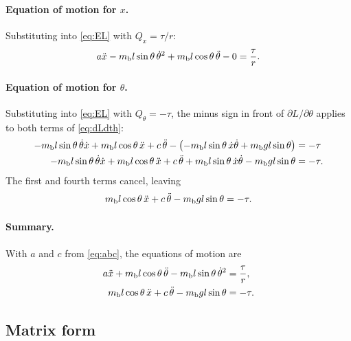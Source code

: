 \paragraph{Equation of motion for $x$.}
Substituting into \cref{eq:EL} with $Q_x = \tau/r$:
\begin{equation}
  a\ddot x - m_{\mathrm b} l\sin\theta\,\dot\theta^2 + m_{\mathrm b} l\cos\theta\,\ddot\theta - 0 = \frac{\tau}{r}.
\end{equation}

\paragraph{Equation of motion for $\theta$.}
Substituting into \cref{eq:EL} with $Q_\theta = -\tau$, the minus sign in front
of $\partial L/\partial\theta$ applies to both terms of \cref{eq:dLdth}:
\begin{align}
  -m_{\mathrm b} l\sin\theta\,\dot\theta\dot x + m_{\mathrm b} l\cos\theta\,\ddot x + c\,\ddot\theta
  - \left(-m_{\mathrm b} l\sin\theta\,\dot x\dot\theta + m_{\mathrm b} g l\sin\theta\right) &= -\tau \nonumber\\
  -m_{\mathrm b} l\sin\theta\,\dot\theta\dot x + m_{\mathrm b} l\cos\theta\,\ddot x + c\,\ddot\theta
  + m_{\mathrm b} l\sin\theta\,\dot x\dot\theta - m_{\mathrm b} g l\sin\theta &= -\tau .
\end{align}
The first and fourth terms cancel, leaving
\begin{equation}
  m_{\mathrm b} l\cos\theta\,\ddot x + c\,\ddot\theta - m_{\mathrm b} g l\sin\theta = -\tau .
\end{equation}

\paragraph{Summary.}
With $a$ and $c$ from \cref{eq:abc}, the equations of motion are
\begin{align}
  a\ddot x + m_{\mathrm b} l\cos\theta\,\ddot\theta - m_{\mathrm b} l\sin\theta\,\dot\theta^2 &= \frac{\tau}{r} , \label{eq:eom-x}\\
  m_{\mathrm b} l\cos\theta\,\ddot x + c\,\ddot\theta - m_{\mathrm b} g l\sin\theta &= -\tau . \label{eq:eom-th}
\end{align}

\subsection{Matrix form}

